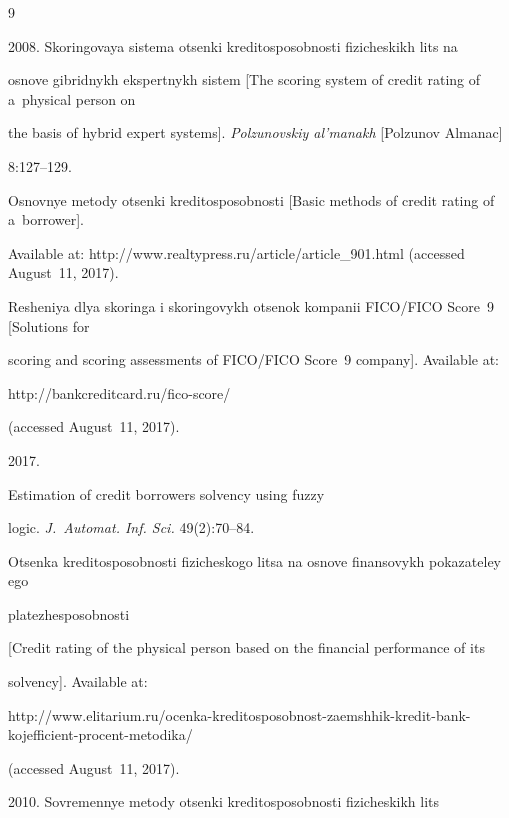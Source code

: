 {\small\frenchspacing

{%


\begin{thebibliography}{9}


 2008. Skoringovaya sistema otsenki kreditosposobnosti fizicheskikh lits na 

osnove gibridnykh ekspertnykh sistem [The scoring system of credit rating of a~physical person on 

the basis of hybrid expert systems]. \textit{Polzunovskiy al'manakh} [Polzunov Almanac]  

8:127--129. 


{Osnovnye metody otsenki kreditosposobnosti} [Basic methods of credit rating of a~borrower]. 

Available at: {\sf http://www.realtypress.ru/article/article\_901.html} (accessed August~11, 2017).


{Resheniya dlya skoringa i skoringovykh otsenok kompanii FICO/FICO Score~9} [Solutions for 

scoring and scoring assessments of FICO/FICO Score~9 company]. Available at: {\sf 

http://bankcreditcard.ru/fico-score/} (accessed August~11, 2017). 


 2017. 

Estimation of credit borrowers solvency using fuzzy 

logic. \textit{J.~Automat. Inf. Sci.}  49(2):70--84. 


{Otsenka kreditosposobnosti fizicheskogo litsa na osnove finansovykh pokazateley ego 

platezhesposobnosti} [Credit rating of the physical person based on the financial performance of its 

solvency]. Available at: {\sf  

http://www.elitarium.ru/ocenka-kreditosposobnost-zaemshhik-kredit-bank-kojefficient-procent-metodika/} (accessed August~11, 2017). 


 2010. Sovremennye metody otsenki kreditosposobnosti fizicheskikh lits 


\end{thebibliography}}}
